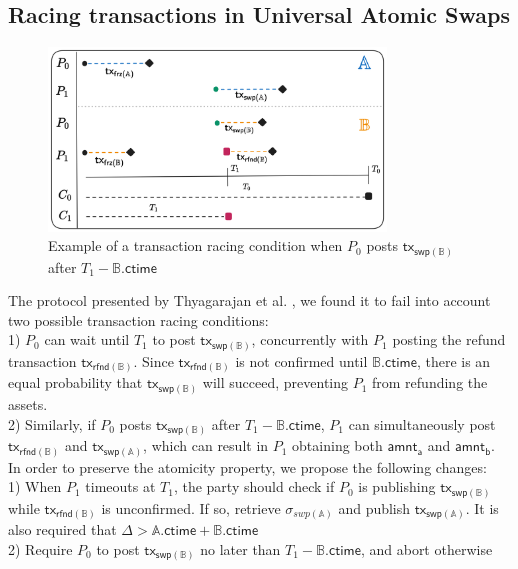 \documentclass{article}      	%
\begin{document}
\newpage 
\subsection{Racing transactions in Universal Atomic Swaps}


\begin{figure}[H]
    \centering
    \includegraphics[width=0.8\textwidth]{timeouts-uas.png}
    \caption{Example of a transaction racing condition when $P_0$ posts $\mathsf{tx_{swp(\mathbb{B})}}$ after $T_1 - \mathbb{B}.\mathsf{ctime}$}
\end{figure}

The protocol presented by Thyagarajan et al. \cite{vts}, we found it to fail into account two possible transaction racing conditions: \\
1) $P_0$ can wait until $T_1$ to post $\mathsf{tx_{swp(\mathbb{B})}}$, concurrently with $P_1$ posting the refund transaction $\mathsf{tx_{rfnd(\mathbb{B})}}$. Since $\mathsf{tx_{rfnd(\mathbb{B})}}$ is not confirmed until $\mathbb{B}.\mathsf{ctime}$, there is an equal probability that $\mathsf{tx_{swp(\mathbb{B})}}$ will succeed, preventing $P_1$ from refunding the assets. \\
2) Similarly, if $P_0$ posts $\mathsf{tx_{swp(\mathbb{B})}}$ after $T_1 - \mathbb{B}.\mathsf{ctime}$, $P_1$ can simultaneously post $\mathsf{tx_{rfnd(\mathbb{B})}}$ and $\mathsf{tx_{swp(\mathbb{A})}}$, which can result in $P_1$ obtaining both $\mathsf{amnt_a}$ and $\mathsf{amnt_b}$. \\

In order to preserve the atomicity property, we propose the following changes: \\
1) When $P_1$ timeouts at $T_1$, the party should check if $P_0$ is publishing $\mathsf{tx_{swp(\mathbb{B})}}$ while $\mathsf{tx_{rfnd(\mathbb{B})}}$ is unconfirmed. If so, retrieve $\sigma_{swp(\mathbb{A})}$ and publish $\mathsf{tx_{swp(\mathbb{A})}}$. It is also required that $\Delta > \mathbb{A}.\mathsf{ctime} + \mathbb{B}.\mathsf{ctime}$ \\
2) Require $P_0$ to post $\mathsf{tx_{swp(\mathbb{B})}}$ no later than $T_1 - \mathbb{B}.\mathsf{ctime}$, and abort otherwise 
\end{document}
